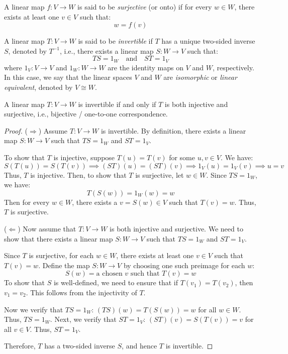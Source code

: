 \documentclass[
	11pt, %
	fleqn, %
	a4paper, %
]{LegrandOrangeBook}
\begin{document}
\begin{definition}
    A linear map $f: V \to W$ is said to be \emph{surjective} (or onto) if for every $w \in W$, there exists at least one $v \in V$ such that:
    \[
        w = f(v)
    \]
\end{definition}

\begin{definition}
    A linear map $T: V \to W$ is said to be \emph{invertible} if $T$ has a unique two-sided inverse $S$, denoted by $T^{-1}$, i.e., there exists a linear map $S: W \to V$ such that:
    \[
        TS = 1_W \quad \text{and} \quad ST = 1_V
    \]
    where $1_V: V \to V$ and $1_W: W \to W$ are the identity maps on $V$ and $W$, respectively.
    In this case, we say that the linear spaces $V$ and $W$ are \emph{isomorphic} or \emph{linear equivalent}, denoted by $V \cong W$.
\end{definition}

\begin{corollary}
    A linear map $T: V \to W$ is invertible if and only if $T$ is both injective and surjective, i.e., bijective / one-to-one correspondence.
\end{corollary}

\begin{proof}
    ($\Rightarrow$) Assume $T: V \to W$ is invertible. By definition, there exists a linear map $S: W \to V$ such that $TS = 1_W$ and $ST = 1_V$.

    To show that $T$ is injective, suppose $T(u) = T(v)$ for some $u, v \in V$. We have:
    \[
        S(T(u)) = S(T(v)) \implies (ST)(u) = (ST)(v) \implies 1_V(u) = 1_V(v) \implies u = v
    \]
    Thus, $T$ is injective. Then, to show that $T$ is surjective, let $w \in W$. Since $TS = 1_W$, we have:
    \[
        T(S(w)) = 1_W(w) = w
    \]
    Then for every $w \in W$, there exists a $v = S(w) \in V$ such that $T(v) = w$. Thus, $T$ is surjective.

    ($\Leftarrow$) Now assume that $T: V \to W$ is both injective and surjective. We need to show that there exists a linear map $S: W \to V$ such that $TS = 1_W$ and $ST = 1_V$.

    Since $T$ is surjective, for each $w \in W$, there exists at least one $v \in V$ such that $T(v) = w$. Define the map $S: W \to V$ by choosing one such preimage for each $w$:
    \[
        S(w) = \text{a chosen } v \text{ such that } T(v) = w
    \]
    To show that $S$ is well-defined, we need to ensure that if $T(v_1) = T(v_2)$, then $v_1 = v_2$. This follows from the injectivity of $T$.

    Now we verify that $TS = 1_W$: $(TS)(w) = T(S(w)) = w$ for all $w \in W$. Thus, $TS = 1_W$. Next, we verify that $ST = 1_V$: $(ST)(v) = S(T(v)) = v$ for all $v \in V$. Thus, $ST = 1_V$.

    Therefore, $T$ has a two-sided inverse $S$, and hence $T$ is invertible.
\end{proof}
\end{document}
